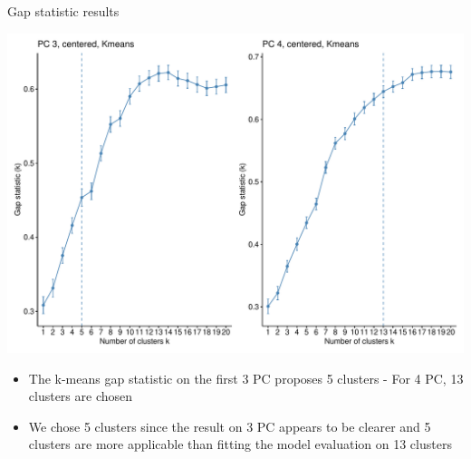 \documentclass[
  ignorenonframetext,
]{beamer}
\providecommand{\tightlist}{%
  \setlength{\itemsep}{0pt}\setlength{\parskip}{0pt}}
\begin{document}
\begin{frame}{Gap statistic results}
\protect\hypertarget{gap-statistic-results}{}
\begin{center}\includegraphics[width=0.75\linewidth]{ma-presentation_files/figure-beamer/unnamed-chunk-11-1} \end{center}

\begin{itemize}
\tightlist
\item
  The k-means gap statistic on the first 3 PC proposes 5 clusters - For
  4 PC, 13 clusters are chosen
\item
  We chose 5 clusters since the result on 3 PC appears to be clearer and
  5 clusters are more applicable than fitting the model evaluation on 13
  clusters
\end{itemize}
\end{frame}
\end{document}
